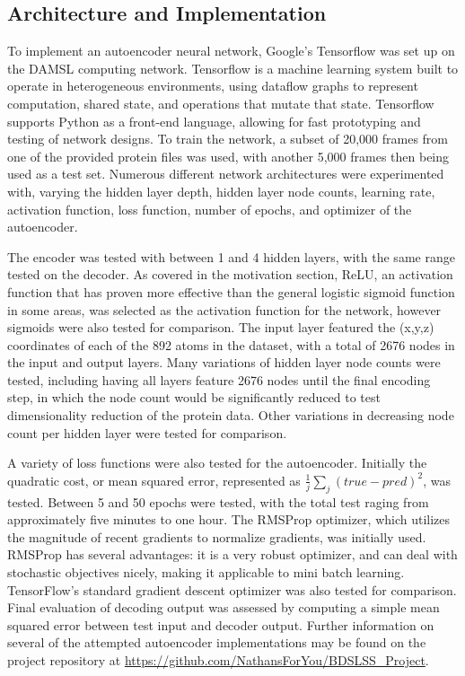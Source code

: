 \documentclass{article}
\begin{document}
\subsection{Architecture and Implementation}
To implement an autoencoder neural network, Google's Tensorflow was set up on the DAMSL computing network. Tensorflow is a machine learning system built to operate in heterogeneous environments, using dataflow graphs to represent computation, shared state, and operations that mutate that state. Tensorflow supports Python as a front-end language, allowing for fast prototyping and testing of network designs. To train the network, a subset of 20,000 frames from one of the provided protein files was used, with another 5,000 frames then being used as a test set. Numerous different network architectures were experimented with, varying the hidden layer depth, hidden layer node counts, learning rate, activation function, loss function, number of epochs, and optimizer of the autoencoder.

The encoder was tested with between 1 and 4 hidden layers, with the same range tested on the decoder. As covered in the motivation section, ReLU, an activation function that has proven more effective than the general logistic sigmoid function in some areas, was selected as the activation function for the network, however sigmoids were also tested for comparison. The input layer featured the (x,y,z) coordinates of each of the 892 atoms in the dataset, with a total of 2676 nodes in the input and output layers. Many variations of hidden layer node counts were tested, including having all layers feature 2676 nodes until the final encoding step, in which the node count would be significantly reduced to test dimensionality reduction of the protein data. Other variations in decreasing node count per hidden layer were tested for comparison. 

A variety of loss functions were also tested for the autoencoder. Initially the quadratic cost, or mean squared error, represented as $\frac{1}{j}\sum_{j}(true - pred)^2$, was tested. Between 5 and 50 epochs were tested, with the total test raging from approximately five minutes to one hour. The RMSProp optimizer, which utilizes the magnitude of recent gradients to normalize gradients, was initially used. RMSProp has several advantages: it is a very robust optimizer, and can deal with stochastic objectives nicely, making it applicable to mini batch learning. TensorFlow's standard gradient descent optimizer was also tested for comparison. Final evaluation of decoding output was assessed by computing a simple mean squared error between test input and decoder output. Further information on several of the attempted autoencoder implementations may be found on the project repository at \url{https://github.com/NathansForYou/BDSLSS_Project}.
\end{document}
